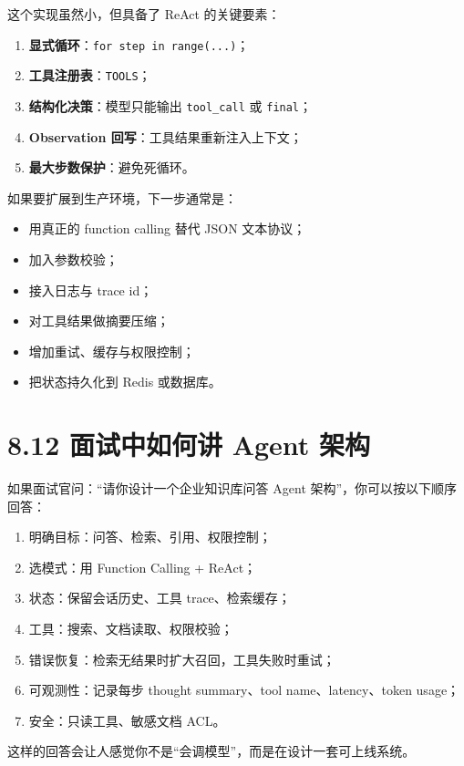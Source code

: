 这个实现虽然小，但具备了 ReAct 的关键要素：


\begin{enumerate}[leftmargin=2em]
\item \textbf{显式循环}：\texttt{for step in range(...)}；
\item \textbf{工具注册表}：\texttt{TOOLS}；
\item \textbf{结构化决策}：模型只能输出 \texttt{tool\_call} 或 \texttt{final}；
\item \textbf{Observation 回写}：工具结果重新注入上下文；
\item \textbf{最大步数保护}：避免死循环。
\end{enumerate}

如果要扩展到生产环境，下一步通常是：


\begin{itemize}[leftmargin=2em]
\item 用真正的 function calling 替代 JSON 文本协议；
\item 加入参数校验；
\item 接入日志与 trace id；
\item 对工具结果做摘要压缩；
\item 增加重试、缓存与权限控制；
\item 把状态持久化到 Redis 或数据库。
\end{itemize}

\section{8.12 面试中如何讲 Agent 架构}

如果面试官问：``请你设计一个企业知识库问答 Agent 架构''，你可以按以下顺序回答：


\begin{enumerate}[leftmargin=2em]
\item 明确目标：问答、检索、引用、权限控制；
\item 选模式：用 Function Calling + ReAct；
\item 状态：保留会话历史、工具 trace、检索缓存；
\item 工具：搜索、文档读取、权限校验；
\item 错误恢复：检索无结果时扩大召回，工具失败时重试；
\item 可观测性：记录每步 thought summary、tool name、latency、token usage；
\item 安全：只读工具、敏感文档 ACL。
\end{enumerate}

这样的回答会让人感觉你不是``会调模型''，而是在设计一套可上线系统。


